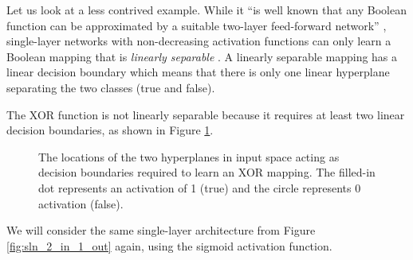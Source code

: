 \begin{example}
    Let us look at a less contrived example.
    While it ``is well known that any Boolean function \elide can be approximated by a suitable two-layer feed-forward network'' \cite{blum1989}, 
    single-layer networks with non-decreasing activation functions can only learn a Boolean mapping that is \textit{linearly separable} \cite[p. 723]{russell2010}.
    A linearly separable mapping has a linear decision boundary which means that there is only one linear hyperplane separating the two classes (true and false).
    
    The XOR function is not linearly separable because it requires at least two linear decision boundaries, as shown in Figure \ref{fig:xor}.
    \begin{figure}
        \centering
        \caption{The locations of the two hyperplanes in input space acting as decision boundaries required to learn an XOR mapping. The filled-in dot represents an activation of 1 (true) and the circle represents 0 activation (false).}
        \label{fig:xor}
    \end{figure}
    We will consider the same single-layer architecture from Figure \ref{fig:sln_2_in_1_out} again, using the sigmoid activation function.

\end{example}
